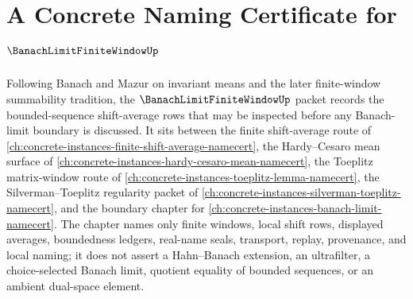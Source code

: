 \chapter{A Concrete Naming Certificate for $\BanachLimitFiniteWindowUp$}
\label{ch:concrete-instances-banach-limit-finite-window-namecert}

Following Banach and Mazur on invariant means and the later finite-window summability tradition, the $\BanachLimitFiniteWindowUp$ packet records the bounded-sequence shift-average rows that may be inspected before any Banach-limit boundary is discussed. It sits between the finite shift-average route of \autoref{ch:concrete-instances-finite-shift-average-namecert}, the Hardy--Cesaro mean surface of \autoref{ch:concrete-instances-hardy-cesaro-mean-namecert}, the Toeplitz matrix-window route of \autoref{ch:concrete-instances-toeplitz-lemma-namecert}, the Silverman--Toeplitz regularity packet of \autoref{ch:concrete-instances-silverman-toeplitz-namecert}, and the boundary chapter for \autoref{ch:concrete-instances-banach-limit-namecert}. The chapter names only finite windows, local shift rows, displayed averages, boundedness ledgers, real-name seals, transport, replay, provenance, and local naming; it does not assert a Hahn--Banach extension, an ultrafilter, a choice-selected Banach limit, quotient equality of bounded sequences, or an ambient dual-space element.

